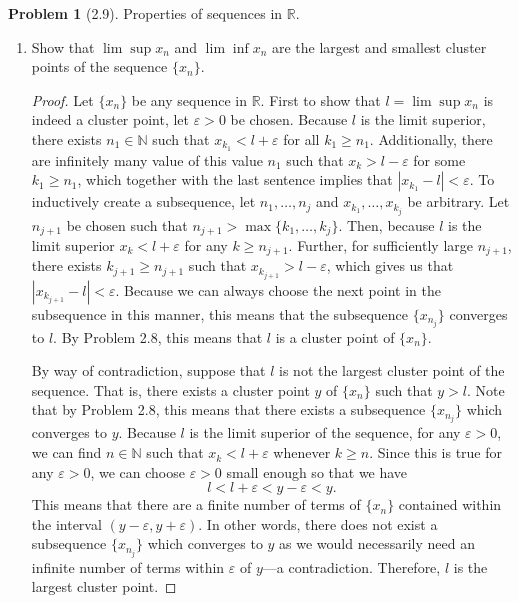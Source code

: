 \documentclass[12pt]{article}
\newcommand{\R}{\mathbb{R}}
\newcommand{\N}{\mathbb{N}}
\renewcommand{\epsilon}{\varepsilon}
\theoremstyle{definition}
\newtheorem{problem}{Problem}
\begin{document}
\begin{problem}[2.9]
    Properties of sequences in \( \R \).
    \begin{enumerate}[label = (\alph{*}.)] 
  
        \item Show that \( \lim \sup x_n \) and \( \lim \inf x_n \) are the largest and smallest cluster points of the sequence \( \{ x_n\} \).
            \begin{proof}
                Let \( \{ x_n \} \) be any sequence in \( \R \). First to show that \( l  = \lim \sup x_n \) is indeed a cluster point, let \( \epsilon > 0 \) be chosen. Because \( l \) is the limit superior, there exists \( n_1 \in \N \) such that \( x_{k_{1}} < l + \epsilon \) for all \( k_1 \geq n_1 \). Additionally, there are infinitely many value of this value \( n_1 \) such that \( x_k  > l - \epsilon \) for some \( k_1 \geq n_1 \), which together with the last sentence implies that \( | x_{k_{1}} - l | < \epsilon \). To inductively create a subsequence, let \( n_1, \ldots, n_j \) and \( x_{k_{1}}, \ldots, x_{k_{j}} \) be arbitrary. Let \( n_{j+1} \) be chosen such that \( n_{j+1} > \max \{ k_1, \ldots, k_j \} \). Then, because \( l \) is the limit superior \( x_{k} < l + \epsilon \) for any \( k \geq n_{j+1} \). Further, for sufficiently large \( n_{j+1} \), there exists \( k_{j+1} \geq n_{j+1} \) such that \( x_{k_{j+1}} > l - \epsilon \), which gives us that \( | x_{k_{j+1}} - l| < \epsilon \). Because we can always choose the next point in the subsequence in this manner, this means that the  subsequence \( \{ x_{n_{j} }\} \) converges to \( l \). By Problem 2.8, this means that \( l \) is a cluster point of \( \{ x_n \} \).
                
                By way of contradiction, suppose that \( l \) is not the largest cluster point of the sequence. That is, there exists a cluster point \( y \) of \( \{ x_n \} \) such that \( y > l \). Note that by Problem 2.8, this means that there exists a subsequence \( \{ x_{n_{j} }\} \) which converges to \( y \). Because \( l \) is the limit superior of the sequence, for any \( \epsilon > 0 \), we can find \( n \in \N \) such that \( x_k < l + \epsilon \) whenever \( k \geq n \). Since this is true for any \( \epsilon > 0 \), we can choose \( \epsilon > 0 \) small enough so that we have 
                    \[
                        l < l + \epsilon < y - \epsilon < y.  
                    \]
                This means that there are a finite number of terms of \( \{ x_n \} \) contained within the interval \( (y - \epsilon, y + \epsilon) \). In other words, there does not exist a subsequence \( \{ x_{n_{j} }\} \) which converges to \( y \) as we would necessarily need an infinite number of terms  within \( \epsilon \) of \( y \)---a contradiction. Therefore, \( l \) is the largest cluster point.


\end{proof}
\end{enumerate}
\end{problem}
\end{document}
